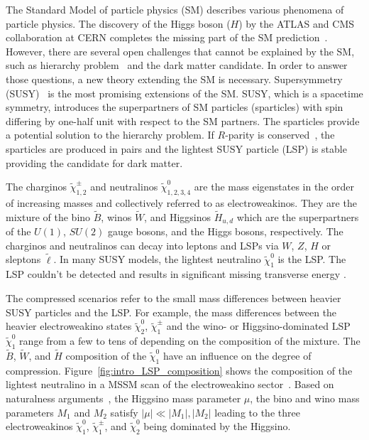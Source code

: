 The Standard Model of particle physics (SM) describes various phenomena of particle physics.
The discovery of the Higgs boson ($H$) by the ATLAS and CMS collaboration at CERN completes the missing part of the SM prediction~\cite{Aad:2012tfa, Chatrchyan:2012xdj}.
However, there are several open challenges that cannot be explained by the SM, such as hierarchy problem~\cite{Weinberg:1975gm, Gildener:1976ai, Susskind:1978ms} and the dark matter candidate.
In order to answer those questions, a new theory extending the SM is necessary.
Supersymmetry (SUSY)~\cite{Wess:1973kz, Wess:1974tw, Golfand:1971iw, Martin:1997ns} is the most promising extensions of the SM.
SUSY, which is a spacetime symmetry, introduces the superpartners of SM particles (sparticles) with spin differing by one-half unit with respect to the SM partners.
The sparticles provide a potential solution to the hierarchy problem.
If $R$-parity is conserved~\cite{Fayet:1976et, Fayet:1977yc, Farrar:1978xj}, the sparticles are produced in pairs and the lightest SUSY particle (LSP) is stable providing the candidate for dark matter.

The charginos $\widetilde{\chi}^{\pm}_{1,2}$ and neutralinos $\widetilde{\chi}^{0}_{1,2,3,4}$ are the mass eigenstates in the order of increasing masses and collectively referred to as electroweakinos.
They are the mixture of the bino $\widetilde{B}$, winos $\widetilde{W}$, and Higgsinos $\widetilde{H}_{u,d}$ which are the superpartners of the $U(1)$, $SU(2)$ gauge bosons, and the Higgs bosons, respectively.
The charginos and neutralinos can decay into leptons and LSPs via $W$, $Z$, $H$ or sleptons $\widetilde{\ell}$.
In many SUSY models, the lightest neutralino $\widetilde{\chi}^{0}_{1}$ is the LSP.
The LSP couldn't be detected and results in significant missing transverse energy \MET.

The compressed scenarios refer to the small mass differences between heavier SUSY particles and the LSP.
For example, the mass differences between the heavier electroweakino states $\widetilde{\chi}^{0}_{2}$, $\widetilde{\chi}^{\pm}_{1}$ and the wino- or Higgsino-dominated LSP $\widetilde{\chi}^{0}_{1}$ range from a few {\MeV} to tens of {\GeV} depending on the composition of the mixture.
The $\widetilde{B}$, $\widetilde{W}$, and $\widetilde{H}$ composition of the $\widetilde{\chi}^{0}_{1}$ have an influence on the degree of compression.
Figure~\ref{fig:intro_LSP_composition} shows the composition of the lightest neutralino in a MSSM scan of the electroweakino sector~\cite{Aaboud:2016wna}.
Based on naturalness arguments~\cite{Barbieri:1987fn, deCarlos:1993rbr}, the Higgsino mass parameter $\mu$, the bino and wino mass parameters $M_{1}$ and $M_{2}$ satisfy $|\mu| \ll |M_{1}|, |M_{2}|$ leading to the three electroweakinos $\widetilde{\chi}^{0}_{1}$, $\widetilde{\chi}^{\pm}_{1}$, and $\widetilde{\chi}^{0}_{2}$ being dominated by the Higgsino.

